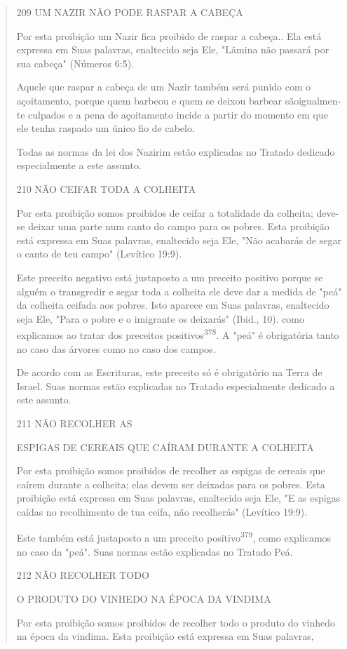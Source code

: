 \begin{quote}
209 UM NAZIR NÃO PODE RASPAR A CABEÇA

Por esta proibição um Nazir fica proibido de raspar a cabeça.. Ela es­tá
expressa em Suas palavras, enaltecido seja Ele, "Lâmina não passará por
sua cabeça" (Números 6:5).

Aquele que raspar a cabeça de um Nazir também será punido com o
açoitamento, porque quem barbeou e quem se deixou barbear sãoigualmen­te
culpados e a pena de açoitamento incide a partir do momento em que ele
tenha raspado um único fio de cabelo.

Todas as normas da lei dos Nazirim estão explicadas no Tratado de­dicado
especialmente a este assunto.

210 NÃO CEIFAR TODA A COLHEITA

Por esta proibição somos proibidos de ceifar a totalidade da colhei­ta;
deve-se deixar uma parte num canto do campo para os pobres. Esta
proibi­ção está expressa em Suas palavras, enaltecido seja Ele, "Não
acabarás de segar o canto de teu campo" (Levítico 19:9).

Este preceito negativo está justaposto a um preceito positivo por­que se
alguém o transgredir e segar toda a colheita ele deve dar a medida de
"peá" da colheita ceifada aos pobres. Isto aparece em Suas palavras,
enaltecido seja Ele, "Para o pobre e o imigrante os deixarás" (Ibid.,
10). como explicamos ao tratar dos preceitos
positivos\textsuperscript{378}. A "peá" é obrigatória tanto no caso das
árvores como no caso dos campos.

De acordo com as Escrituras, este preceito só é obrigatório na Terra de
Israel. Suas normas estão explicadas no Tratado especialmente dedicado a
este assunto.

211 NÃO RECOLHER AS

ESPIGAS DE CEREAIS QUE CAÍRAM DURANTE A COLHEITA

Por esta proibição somos proibidos de recolher as espigas de cereais que
caírem durante a colheita; elas devem ser deixadas para os pobres. Esta
proi­bição está expressa em Suas palavras, enaltecido seja Ele, "E as
espigas caídas no recolhimento de tua ceifa, não recolherás" (Levítico
19:9).

Este também está justaposto a um preceito positivo\textsuperscript{379},
como expli­camos no caso da "peá". Suas normas estão explicadas no
Tratado Peá.

212 NÃO RECOLHER TODO

O PRODUTO DO VINHEDO NA ÉPOCA DA VINDIMA

Por esta proibição somos proibidos de recolher todo o produto do vinhedo
na época da vindima. Esta proibição está expressa em Suas palavras,
\end{quote}

